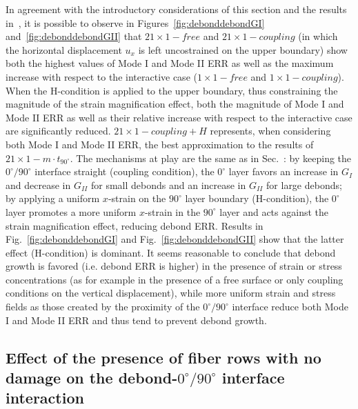 \documentclass[Review,sagev,times]{sagej}
\begin{document}
In agreement with the introductory considerations of this section and the results in~\cite{DiStasio2019}, it is possible to observe in Figures~\ref{fig:debonddebondGI} and~\ref{fig:debonddebondGII} that $21\times 1-free$ and $21\times 1-coupling$ (in which the horizontal displacement $u_{x}$ is left uncostrained on the upper boundary) show both the highest values of Mode I and Mode II ERR as well as the maximum increase with respect to the interactive case ($1\times 1-free$ and $1\times 1-coupling$). When the H-condition is applied to the upper boundary, thus constraining the magnitude of the strain magnification effect, both the magnitude of Mode I and Mode II ERR as well as their relative increase with respect to the interactive case are significantly reduced. $21\times 1-coupling+H$ represents, when considering both Mode I and Mode II ERR, the best approximation to the results of $21\times 1-m\cdot t_{90^{\circ}}$. The mechanisms at play are the same as in Sec.~: by keeping the $0^{\circ}/90^{\circ}$ interface straight (coupling condition), the $0^{\circ}$ layer favors an increase in $G_{I}$ and decrease in $G_{II}$ for small debonds and an increase in $G_{II}$ for large debonds; by applying a uniform $x$-strain on the $90^{\circ}$ layer boundary (H-condition), the $0^{\circ}$ layer promotes a more uniform $x$-strain in the $90^{\circ}$ layer and acts against the strain magnification effect, reducing debond ERR. Results in Fig.~\ref{fig:debonddebondGI} and Fig.~\ref{fig:debonddebondGII} show that the latter effect (H-condition) is dominant. It seems reasonable to conclude that debond growth is favored (i.e. debond ERR is higher) in the presence of strain or stress concentrations (as for example in the presence of a free surface or only coupling conditions on the vertical displacement), while more uniform strain and stress fields as those created by the proximity of the $0^{\circ}/90^{\circ}$ interface reduce both Mode I and Mode II ERR and thus tend to prevent debond growth.

\subsection{Effect of the presence of fiber rows with no damage on the debond-$0^{\circ}/90^{\circ}$ interface interaction}
\end{document}
